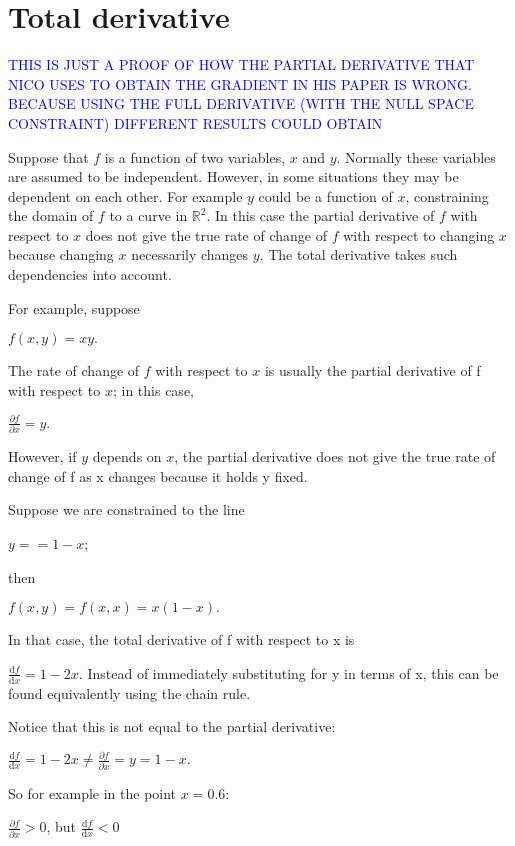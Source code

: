 \chapter{Total derivative }
\label{chapter:totalderivative}


\textcolor{blue}{THIS IS JUST A PROOF OF HOW THE PARTIAL DERIVATIVE THAT NICO USES TO OBTAIN THE GRADIENT IN HIS PAPER IS WRONG. BECAUSE USING THE FULL DERIVATIVE (WITH THE NULL SPACE CONSTRAINT) DIFFERENT RESULTS COULD OBTAIN }

Suppose that $f$ is a function of two variables, $x$ and $y$. Normally these variables are assumed to be independent. However, in some situations they may be dependent on each other. For example $y$ could be a function of $x$, constraining the domain of $f$ to a curve in   $\mathbb{R}^{2}$. In this case the partial derivative of $f$ with respect to $x$ does not give the true rate of change of $f$ with respect to changing $x$ because changing $x$ necessarily changes $y$. The total derivative takes such dependencies into account.

For example, suppose

$f(x,y)=xy.$


The rate of change of $f$ with respect to $x$ is usually the partial derivative of f with respect to $x$; in this case,

$ \frac{\partial f}{\partial x} = y.$


However, if $y$ depends on $x$, the partial derivative does not give the true rate of change of f as x changes because it holds y fixed.

Suppose we are constrained to the line

$y= = 1-x$;


then

$f(x,y) = f(x,x) = x(1-x).$


In that case, the total derivative of f with respect to x is

$\frac{\mathrm{d}f}{\mathrm{d}x} = 1 - 2 x.$
Instead of immediately substituting for y in terms of x, this can be found equivalently using the chain rule.

 
Notice that this is not equal to the partial derivative:

$ \frac{\mathrm{d}f}{\mathrm{d}x} = 1 - 2 x \neq \frac{\partial f}{\partial x} = y =1 - x.
$

So for example in the point $x=0.6$:

$\frac{\partial f}{\partial x} > 0$, but  $ \frac{\mathrm{d}f}{\mathrm{d}x} < 0$